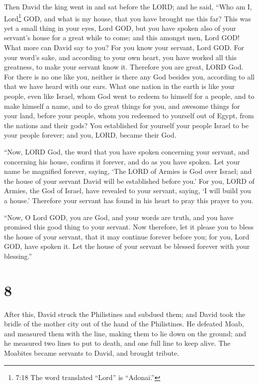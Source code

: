  Then David the king went in and sat before the LORD; and
he said, ``Who am I, Lord\footnote{7:18 The word translated ``Lord'' is
  ``Adonai.''} GOD, and what is my house, that you have brought me this
far?  This was yet a small thing in your eyes, Lord GOD,
but you have spoken also of your servant's house for a great while to
come; and this amongst men, Lord GOD!  What more can David
say to you? For you know your servant, Lord GOD.  For your
word's sake, and according to your own heart, you have worked all this
greatness, to make your servant know it.  Therefore you are
great, LORD God. For there is no one like you, neither is there any God
besides you, according to all that we have heard with our ears.
 What one nation in the earth is like your people, even
like Israel, whom God went to redeem to himself for a people, and to
make himself a name, and to do great things for you, and awesome things
for your land, before your people, whom you redeemed to yourself out of
Egypt, from the nations and their gods?  You established
for yourself your people Israel to be your people forever; and you,
LORD, became their God.

 ``Now, LORD God, the word that you have spoken concerning
your servant, and concerning his house, confirm it forever, and do as
you have spoken.  Let your name be magnified forever,
saying, `The LORD of Armies is God over Israel; and the house of your
servant David will be established before you.'  For you,
LORD of Armies, the God of Israel, have revealed to your servant,
saying, `I will build you a house.' Therefore your servant has found in
his heart to pray this prayer to you.

 ``Now, O Lord GOD, you are God, and your words are truth,
and you have promised this good thing to your servant.  Now
therefore, let it please you to bless the house of your servant, that it
may continue forever before you; for you, Lord GOD, have spoken it. Let
the house of your servant be blessed forever with your blessing.''

\hypertarget{section-7}{%
\section{8}\label{section-7}}

 After this, David struck the Philistines and subdued them;
and David took the bridle of the mother city out of the hand of the
Philistines.  He defeated Moab, and measured them with the
line, making them to lie down on the ground; and he measured two lines
to put to death, and one full line to keep alive. The Moabites became
servants to David, and brought tribute.

